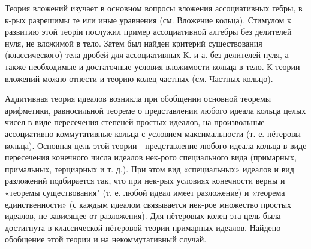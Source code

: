 \documentclass[10pt]{article}
\begin{document}
Теория вложений изучает в основном вопросы вложения ассоциативных гебры, в к-рых разрешимы те или иные уравнения (см. Вложение кольца). Стимулом к развитию этой теоріи послужил пример ассоциативной алгебры без делителей нуля, не вложимой в тело. Затем был найден критерий существования (классического) тела дробей для ассоциативных К. и а. без делителей нуля, а также необходимые и достаточные условия вложимости кольца в тело. К теории вложений можно отнести и теорию колец частных (см. Частных кольцо).



Аддитивная теория идеалов возникла при обобщении основной теоремы арифметики, равносильной теореме о представлении любого идеала кольца целых чисел в виде пересечения степеней простых идеалов, на произвольные ассоциативно-коммутативные кольца с условием максимальности (т. е. нётеровы кольца). Основная цель этой теории - представление любого идеала кольца в виде пересечения конечного числа идеалов нек-рого специального вида (примарных, примальных, терциарных и т. д.). При этом вид «специальных» идеалов и вид разложений подбирается так, что при нек-рых условиях конечности верны и «теоремы существования" (т. е. любой идеал имеет разложение) и «теорема единственности» (с каждым идеалом связывается нек-рое множество простых идеалов, не зависящее от разложения). Для нётеровых колец эта цель была достигнута в классической нётеровой теории примарных идеалов. Найдено обобщение этой теории и на некоммутативный случай.
\end{document}
